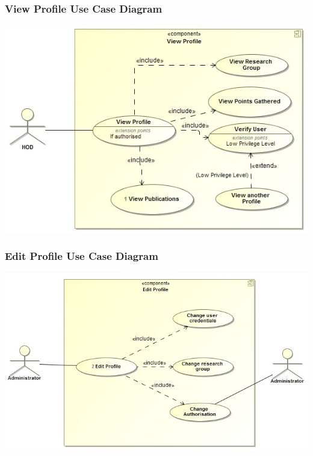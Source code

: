 \documentclass[a4paper,12pt]{article}
\begin{document}
	\subsubsection{View Profile Use Case Diagram}
	\includegraphics[width=1\textwidth]{./ViewProfile.jpg}\\[1.5cm]
	
	\subsubsection{Edit Profile Use Case Diagram}
	\includegraphics[width=1\textwidth]{./EditProfile.jpg}\\[1.5cm]
	
\end{document}
